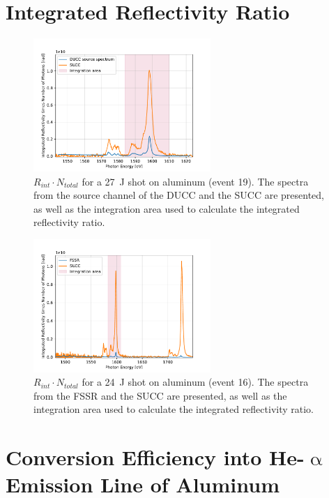 \section{Integrated Reflectivity Ratio}
\label{appendix: integrated reflectivity ratio}

\begin{figure}[H]
	\centering
	\includegraphics[width=0.6\textwidth]{Data_Analysis/R_int_ratio/spectra_of_Al_event_19_source.pdf}
	\caption{$R_{int}\cdot N_{total}$ for a \SI{27}{\joule} shot on aluminum (event 19). The spectra from the source channel of the DUCC and the SUCC are presented, as well as the integration area used to calculate the integrated reflectivity ratio.}
	\label{}
\end{figure}

\begin{figure}[H]
	\centering
	\includegraphics[width=0.6\textwidth]{Data_Analysis/R_int_ratio/spectra_of_Al_(thick)_event_16.pdf}
	\caption{$R_{int}\cdot N_{total}$ for a \SI{24}{\joule} shot on aluminum (event 16). The spectra from the FSSR and the SUCC are presented, as well as the integration area used to calculate the integrated reflectivity ratio.}
	\label{}
\end{figure}

\section{Conversion Efficiency into He-$\upalpha$ Emission Line of Aluminum}


